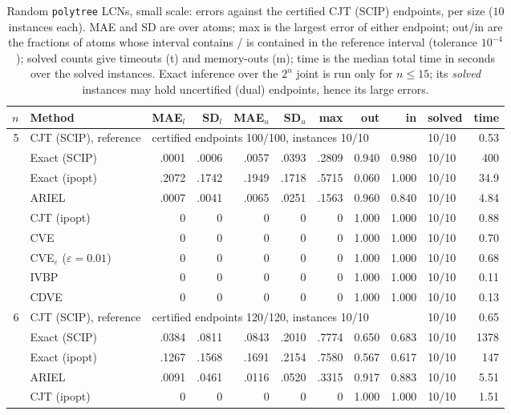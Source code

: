 \begin{table}[htbp]
\centering
\scriptsize
\caption{Random \texttt{polytree} LCNs, small scale: errors against the certified CJT (SCIP) endpoints, per size ($10$ instances each). MAE and SD are over atoms; max is the largest error of either endpoint; out/in are the fractions of atoms whose interval contains / is contained in the reference interval (tolerance $10^{-4}$); solved counts give timeouts (t) and memory-outs (m); time is the median total time in seconds over the solved instances. Exact inference over the $2^n$ joint is run only for $n \le 15$; its \emph{solved} instances may hold uncertified (dual) endpoints, hence its large errors.}
\label{tab:full-polytree-small}
\begin{tabular}{rlrrrrrrrlr}
\toprule
$n$ & Method & MAE$_l$ & SD$_l$ & MAE$_u$ & SD$_u$ & max & out & in & solved & time \\
\midrule
5 & CJT (SCIP), reference & \multicolumn{7}{l}{certified endpoints 100/100, instances 10/10} & 10/10 & 0.53 \\
 & Exact (SCIP) & .0001 & .0006 & .0057 & .0393 & .2809 & 0.940 & 0.980 & 10/10 & 400 \\
 & Exact (ipopt) & .2072 & .1742 & .1949 & .1718 & .5715 & 0.060 & 1.000 & 10/10 & 34.9 \\
 & ARIEL & .0007 & .0041 & .0065 & .0251 & .1563 & 0.960 & 0.840 & 10/10 & 4.84 \\
 & CJT (ipopt) & 0 & 0 & 0 & 0 & 0 & 1.000 & 1.000 & 10/10 & 0.88 \\
 & CVE & 0 & 0 & 0 & 0 & 0 & 1.000 & 1.000 & 10/10 & 0.70 \\
 & CVE$_\varepsilon$ ($\varepsilon{=}0.01$) & 0 & 0 & 0 & 0 & 0 & 1.000 & 1.000 & 10/10 & 0.68 \\
 & IVBP & 0 & 0 & 0 & 0 & 0 & 1.000 & 1.000 & 10/10 & 0.11 \\
 & CDVE & 0 & 0 & 0 & 0 & 0 & 1.000 & 1.000 & 10/10 & 0.13 \\
\midrule
6 & CJT (SCIP), reference & \multicolumn{7}{l}{certified endpoints 120/120, instances 10/10} & 10/10 & 0.65 \\
 & Exact (SCIP) & .0384 & .0811 & .0843 & .2010 & .7774 & 0.650 & 0.683 & 10/10 & 1378 \\
 & Exact (ipopt) & .1267 & .1568 & .1691 & .2154 & .7580 & 0.567 & 0.617 & 10/10 & 147 \\
 & ARIEL & .0091 & .0461 & .0116 & .0520 & .3315 & 0.917 & 0.883 & 10/10 & 5.51 \\
 & CJT (ipopt) & 0 & 0 & 0 & 0 & 0 & 1.000 & 1.000 & 10/10 & 1.51 \\

\end{tabular}
\end{table}
